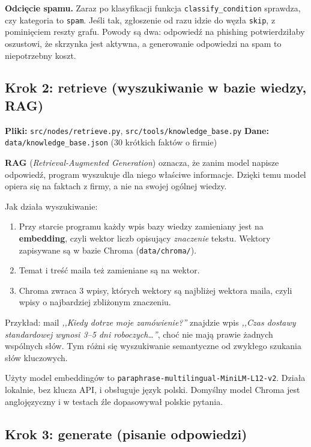 \documentclass[11pt,a4paper]{article}
\newcommand{\plik}[1]{\texttt{#1}}
\begin{document}
\textbf{Odcięcie spamu.} Zaraz po klasyfikacji funkcja
\texttt{classify\_condition} sprawdza, czy kategoria to \texttt{spam}. Jeśli
tak, zgłoszenie od razu idzie do węzła \texttt{skip}, z pominięciem reszty
grafu. Powody są dwa: odpowiedź na phishing potwierdziłaby oszustowi, że
skrzynka jest aktywna, a generowanie odpowiedzi na spam to niepotrzebny koszt.

\subsection{Krok 2: retrieve (wyszukiwanie w bazie wiedzy, RAG)}

\textbf{Pliki:} \plik{src/nodes/retrieve.py},
\plik{src/tools/knowledge_base.py}\quad
\textbf{Dane:} \plik{data/knowledge_base.json} (30 krótkich faktów o firmie)

\textbf{RAG} (\emph{Retrieval-Augmented Generation}) oznacza, że zanim model
napisze odpowiedź, program wyszukuje dla niego właściwe informacje. Dzięki
temu model opiera się na faktach z firmy, a nie na swojej ogólnej wiedzy.

Jak działa wyszukiwanie:

\begin{enumerate}
  \item Przy starcie programu każdy wpis bazy wiedzy zamieniany jest na
        \textbf{embedding}, czyli wektor liczb opisujący \emph{znaczenie}
        tekstu. Wektory zapisywane są w bazie Chroma (\plik{data/chroma/}).
  \item Temat i treść maila też zamieniane są na wektor.
  \item Chroma zwraca 3 wpisy, których wektory są najbliżej wektora maila,
        czyli wpisy o najbardziej zbliżonym znaczeniu.
\end{enumerate}

Przykład: mail \emph{,,Kiedy dotrze moje zamówienie?''} znajdzie wpis
\emph{,,Czas dostawy standardowej wynosi 3--5 dni roboczych\ldots''}, choć
nie mają prawie żadnych wspólnych słów. Tym różni się wyszukiwanie
semantyczne od zwykłego szukania słów kluczowych.

Użyty model embeddingów to \texttt{paraphrase-multilingual-MiniLM-L12-v2}.
Działa lokalnie, bez klucza API, i obsługuje język polski. Domyślny model
Chroma jest anglojęzyczny i w testach źle dopasowywał polskie pytania.

\subsection{Krok 3: generate (pisanie odpowiedzi)}
\end{document}
